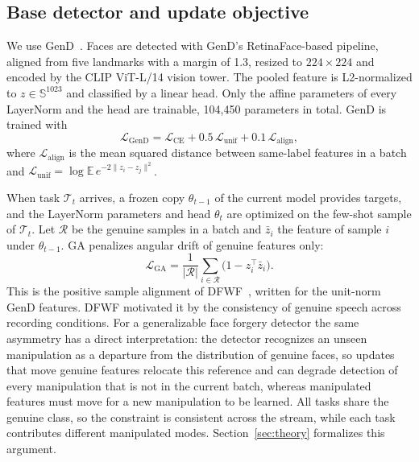 \documentclass[journal]{IEEEtran}
\begin{document}
\subsection{Base detector and update objective}
We use GenD~\cite{yermakov2026gend}. Faces are detected with GenD's RetinaFace-based pipeline, aligned from five landmarks with a margin of 1.3, resized to $224\times224$ and encoded by the CLIP ViT-L/14 vision tower. The pooled feature is L2-normalized to $z\in\mathbb{S}^{1023}$ and classified by a linear head. Only the affine parameters of every LayerNorm and the head are trainable, 104{,}450 parameters in total. GenD is trained with
\begin{equation}
\mathcal{L}_{\mathrm{GenD}}=\mathcal{L}_{\mathrm{CE}}+0.5\,\mathcal{L}_{\mathrm{unif}}+0.1\,\mathcal{L}_{\mathrm{align}},
\end{equation}
where $\mathcal{L}_{\mathrm{align}}$ is the mean squared distance between same-label features in a batch and $\mathcal{L}_{\mathrm{unif}}=\log\mathbb{E}\,e^{-2\|z_i-z_j\|^2}$.

When task $\mathcal{T}_t$ arrives, a frozen copy $\theta_{t-1}$ of the current model provides targets, and the LayerNorm parameters and head $\theta_t$ are optimized on the few-shot sample of $\mathcal{T}_t$. Let $\mathcal{R}$ be the genuine samples in a batch and $\bar z_i$ the feature of sample $i$ under $\theta_{t-1}$. GA penalizes angular drift of genuine features only:
\begin{equation}
\mathcal{L}_{\mathrm{GA}}=\frac{1}{|\mathcal{R}|}\sum_{i\in\mathcal{R}}\big(1-z_i^{\top}\bar z_i\big).
\end{equation}
This is the positive sample alignment of DFWF~\cite{ma2021dfwf}, written for the unit-norm GenD features. DFWF motivated it by the consistency of genuine speech across recording conditions. For a generalizable face forgery detector the same asymmetry has a direct interpretation: the detector recognizes an unseen manipulation as a departure from the distribution of genuine faces, so updates that move genuine features relocate this reference and can degrade detection of every manipulation that is not in the current batch, whereas manipulated features must move for a new manipulation to be learned. All tasks share the genuine class, so the constraint is consistent across the stream, while each task contributes different manipulated modes. Section~\ref{sec:theory} formalizes this argument.
\end{document}
